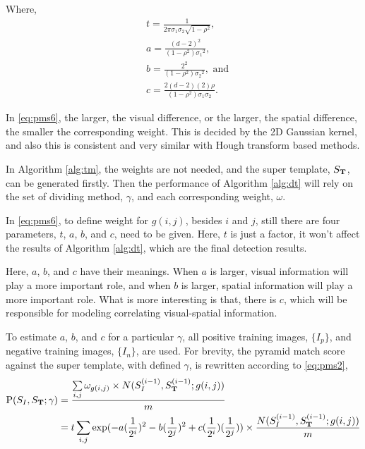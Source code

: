 Where,
\[\begin{aligned}
&t= \frac 1 {2 \pi \sigma_1 \sigma_2 \sqrt{1-\rho^2} } , \\
&a= \frac {(d-2)^2  }{(1-\rho^2){\sigma_1}^2},\\
&b= \frac{2^2 }{(1-\rho^2){\sigma_2}^2 },\mbox{ and}\\
&c= \frac{2 (d-2) (2)  \rho  }{(1-\rho^2){\sigma_1}{\sigma_2} }.
\end{aligned}
\]

In \ref{eq:pms6}, the larger, the visual difference, or the larger, the spatial difference, the smaller the corresponding weight. This is decided by the 2D Gaussian kernel, and also this is consistent and very similar with Hough transform based methods.

In Algorithm \ref{alg:tm}, the weights are not needed, and the super template, $S_{\bf T}$, can be generated firstly. Then the performance of Algorithm \ref{alg:dt} will rely on the set of dividing method, $\gamma$, and each corresponding weight, $\omega$.


In \ref{eq:pms6}, to define weight for $g(i,j)$, besides $i$ and $j$, still there are four parameters, $t$, $a$, $b$, and $c$, need to be given. Here, $t$ is just a factor, it won't affect the results of Algorithm \ref{alg:dt}, which are the final detection results.

Here, $a$, $b$, and $c$ have their meanings. When $a$ is larger, visual information will play a more important role, and when $b$ is larger, spatial information will play a more important role. What is more interesting is that, there is $c$, which will be responsible for modeling correlating visual-spatial information.

To estimate $a$, $b$, and $c$ for a particular $\gamma$, all positive training images, $\{I_p\}$, and negative training images, $\{I_n\}$, are used. For brevity, the pyramid match score against the super template, with defined $\gamma$, is rewritten according to \ref{eq:pms2},
\begin{equation}
\begin{aligned}
{\rm P}(S_{I},S_{\bf{T}};\gamma)&=\frac{ \sum\limits_{i,j}{{\omega}_{g(i,j)}\times N(S_I^{(i-1)},S_{\bf T}^{(i-1)}; g(i,j)) }}{m}\\
&=t \sum\limits_{i,j}{  \exp(-a (\frac 1 {2^i})^2 - b (\frac 1 {2^j})^2 + c (\frac 1 {2^i}) (\frac 1 {2^j}))  \times \frac{ N(S_I^{(i-1)},S_{\bf T}^{(i-1)}; g(i,j))} m }\\
\end{aligned}
\label{eq:pms7}
\end{equation}

